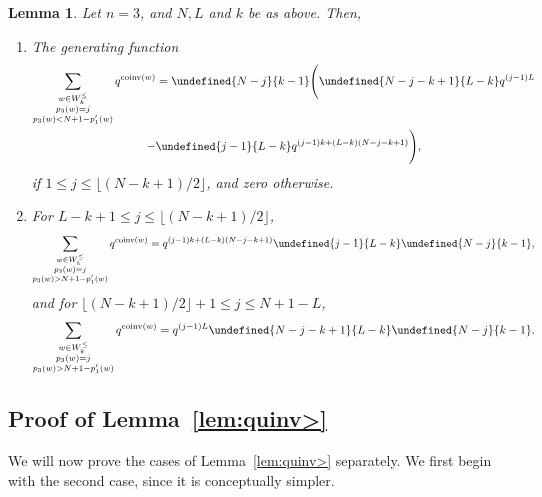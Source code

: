 \documentclass[11pt]{article}
\newtheorem{lemma}[theo]{Lemma}
\theoremstyle{definition}
\providecommand{\qbinom}[2]{\genfrac{[}{]}{0pt}{}{#1}{#2}}
\numberwithin{equation}{section}
\DeclareMathOperator{\coinv}{coinv}
\let\qbinom\undefined
\newcommand{\qbinom}[2]{\bgroup\renewcommand*{\arraystretch}{1}\begin{bmatrix} #1 \\ #2\end{bmatrix} \egroup}
\begin{document}
\begin{lemma}
\label{lem:quinv<}
Let $n=3$, and $N, L$ and $k$ be as above. Then, 
\begin{enumerate}[label=(\arabic*)]
\item \label{it4vvt1}
The generating function
\begin{multline}
\label{quinv<l}
\sum_{\substack{ w \in W_k^\leq \\ p_3(w) = j \\ p_3(w) < N+1 - p'_1(w)}} q^{\coinv(w)} 
= \qbinom{N-j}{k-1} \Bigg( \qbinom {N-j-k+1}{L-k} q^{(j-1)L} \\
  - \qbinom{j-1}{L-k} q^{(j-1)k + (L-k)(N-j-k+1)} \Bigg),
\end{multline}
if $1 \leq j \leq \lfloor (N-k+1)/2 \rfloor$, and zero otherwise.

\item \label{it4vvt2}
For $L-k+1 \leq j \leq \lfloor (N-k+1)/2 \rfloor$,
\begin{equation}
\label{quinv<r1}
\sum_{\substack{ w \in W_k^\leq \\ p_3(w) = j \\ p_3(w) > N+1 - p'_1(w)}} q^{\coinv(w)} = q^{(j-1)k + (L-k)(N-j-k+1)}
\qbinom{j-1}{L-k} \qbinom{N-j}{k-1},
\end{equation}
and for $\lfloor (N-k+1)/2 \rfloor + 1 \leq j \leq N +1 - L$,
\begin{equation}
\label{quinv<r2}
\sum_{\substack{ w \in W_k^\leq \\ p_3(w) = j \\ p_3(w) > N+1 - p'_1(w)}} q^{\coinv(w)} = q^{ (j-1) L} 
\qbinom{N-j-k+1}{L-k} \qbinom {N-j}{k-1}.
\end{equation}
\end{enumerate}
\end{lemma}



\subsection{Proof of Lemma~\ref{lem:quinv>}}
We will now prove the cases of Lemma~\ref{lem:quinv>} separately.
We first begin with the second case, since it is conceptually simpler.
\end{document}
